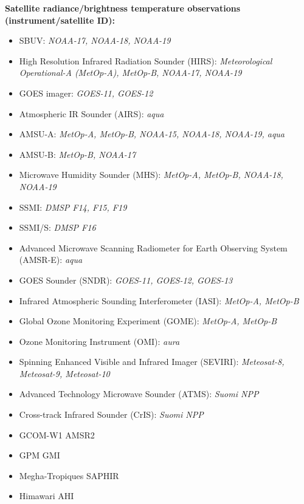 \textbf{Satellite radiance/brightness temperature observations (instrument/satellite ID):}
\begin{itemize}
\item SBUV: \textit {NOAA-17, NOAA-18, NOAA-19}
\item High Resolution Infrared Radiation Sounder (HIRS): \textit {Meteorological Operational-A (MetOp-A), MetOp-B, NOAA-17, NOAA-19}
\item GOES imager: \textit {GOES-11, GOES-12}
\item Atmospheric IR Sounder (AIRS): \textit {aqua}
\item AMSU-A: \textit {MetOp-A, MetOp-B, NOAA-15, NOAA-18, NOAA-19, aqua} 
\item AMSU-B: \textit {MetOp-B, NOAA-17}
\item Microwave Humidity Sounder (MHS): \textit {MetOp-A, MetOp-B, NOAA-18, NOAA-19}
\item SSMI: \textit {DMSP F14, F15, F19}
\item SSMI/S: \textit {DMSP F16}
\item Advanced Microwave Scanning Radiometer for Earth Observing System (AMSR-E): \textit {aqua}
\item GOES Sounder (SNDR): \textit {GOES-11, GOES-12, GOES-13}
\item Infrared Atmospheric Sounding Interferometer (IASI): \textit {MetOp-A, MetOp-B}
\item Global Ozone Monitoring Experiment (GOME): \textit {MetOp-A, MetOp-B}
\item Ozone Monitoring Instrument (OMI): \textit {aura}
\item Spinning Enhanced Visible and Infrared Imager (SEVIRI): \textit {Meteosat-8, Meteosat-9, Meteosat-10}
\item Advanced Technology Microwave Sounder (ATMS): \textit {Suomi NPP}
\item Cross-track Infrared Sounder (CrIS): \textit {Suomi NPP}
\item GCOM-W1 AMSR2 
\item GPM GMI
\item Megha-Tropiques SAPHIR 
\item Himawari AHI
\end{itemize}

